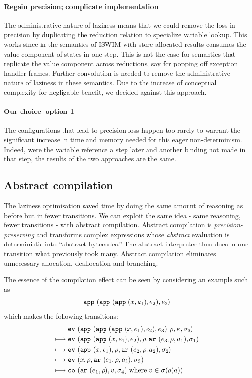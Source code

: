 \documentclass[preprint,onecolumn,9pt]{sigplanconf} %
\begin{document}
\paragraph{Regain precision; complicate implementation}
The administrative nature of laziness means that we could remove the
loss in precision by duplicating the reduction relation to specialize
variable lookup. This works since in the semantics of ISWIM with
store-allocated results consumes the value component of states in one
step. This is not the case for semantics that replicate the value
component across reductions, say for popping off exception handler
frames. Further convolution is needed to remove the administrative
nature of laziness in these semantics. Due to the increase of
conceptual complexity for negligable benefit, we decided against this
approach.

\paragraph{Our choice: option 1}
The configurations that lead to precision loss happen too rarely to
warrant the significant increase in time and memory needed for this
eager non-determinism. Indeed, were the variable reference a step
later and another binding not made in that step, the results of the
two approaches are the same.


\subsection{Abstract compilation}

The laziness optimization saved time by doing the same amount of
reasoning as before but in fewer transitions. We can exploit the same
idea - same reasoning, fewer transitions - with abstract
compilation. Abstract compilation is \emph{precision-preserving} and
transforms complex expressions whose \emph{abstract} evaluation is
deterministic into ``abstract bytecodes.''  The abstract interpreter
then does in one transition what previously took many. Abstract
compilation eliminates unnecessary allocation, deallocation and
branching.

The essence of the compilation effect can be seen by considering an
example such as
\[
{\tt app{\ }}({{\tt app{\ }}({{\tt app{\ }}({x,e_1}),e_2}),e_3})
\]
which makes the following transitions:
\begin{align}
& \ev{\sapp{\sapp{\sapp\mvar{\mexp_1}}{\mexp_2}}{\mexp_3},\menv,\mkont,\msto_0}\\
\machstep\; &
\ev{\sapp{\sapp\mvar{\mexp_1}}{\mexp_2},\menv,\kar{\mexp_3,\menv,\maddr_1},\msto_1}
\\
\machstep\; &
\ev{\sapp\mvar{\mexp_1},\menv,\kar{\mexp_2,\menv,\maddr_2},\msto_2}
\\
\machstep\; &
\ev{\mvar, \menv,\kar{\mexp_1,\menv,\maddr_3},\msto_3} %
\\
\machstep\; &
\co{\kar{\mexp_1,\menv},\mval,\msto_4} %
\mbox{ where } \mval \in \msto(\menv(\maddr))
\end{align}
\end{document}

